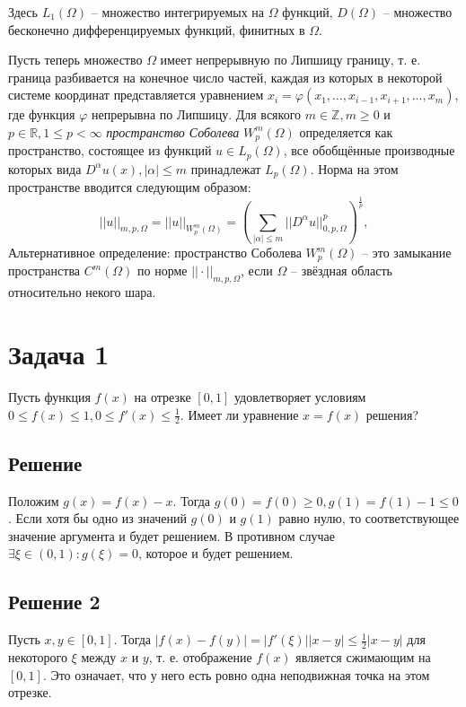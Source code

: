 \documentclass[11pt]{article}
\newcounter{th}\setcounter{th}{0}
\begin{document}
Здесь \(L_1(\Omega)\) -- множество интегрируемых на \(\Omega\) функций, \(D(\Omega)\) -- множество бесконечно дифференцируемых функций, финитных в \(\Omega\).

Пусть теперь множество \(\Omega\) имеет непрерывную по Липшицу границу, т. е. граница разбивается на конечное число частей, каждая из которых в некоторой системе координат представляется уравнением \(x_i = \varphi(x_1, \ldots, x_{i - 1}, x_{i + 1}, \ldots, x_m)\), где функция \(\varphi\) непрерывна по Липшицу. Для всякого \(m \in \mathbb{Z}, m \geq 0\) и \(p \in \mathbb{R}, 1 \leq p < \infty\) \emph{пространство Соболева} \(W^m_p(\Omega)\) определяется как пространство, состоящее из функций \(u \in L_p(\Omega)\), все обобщённые производные которых вида \(D^{\alpha}u(x), |\alpha| \leq m\) принадлежат \(L_p(\Omega)\). Норма на этом пространстве вводится следующим образом:
\begin{equation*}
||u||_{m, p, \Omega} = ||u||_{W_p^m(\Omega)} = \left(\sum_{|\alpha| \leq m}||D^{\alpha}u||^p_{0, p, \Omega}\right)^{\frac1p},
\end{equation*}
Альтернативное определение: пространство Соболева \(W_p^m(\Omega)\) -- это замыкание пространства \(C^m(\Omega)\) по норме \(||\cdot||_{m, p, \Omega}\), если \(\Omega\) -- звёздная область относительно некого шара.
\section{Задача 1}
\label{sec:org391b14f}
Пусть функция \(f(x)\) на отрезке \([0, 1]\) удовлетворяет условиям \(0 \leq f(x) \leq 1, 0 \leq f'(x) \leq \frac12\). Имеет ли уравнение \(x = f(x)\) решения?
\subsection{Решение}
\label{sec:orga8b0e15}
Положим \(g(x) = f(x) - x\). Тогда \(g(0) = f(0) \geq 0, g(1) = f(1) - 1 \leq 0\). Если хотя бы одно из значений \(g(0)\) и \(g(1)\) равно нулю, то соответствующее значение аргумента и будет решением. В противном случае \(\exists \xi \in (0, 1): g(\xi) = 0\), которое и будет решением.
\subsection{Решение 2}
\label{sec:org1e224d7}
Пусть \(x, y \in [0, 1]\). Тогда \(|f(x) - f(y)| = |f'(\xi)||x - y| \leq \frac12|x - y|\) для некоторого \(\xi\) между \(x\) и \(y\), т. е. отображение \(f(x)\) является сжимающим на \([0, 1]\). Это означает, что у него есть ровно одна неподвижная точка на этом отрезке.
\end{document}
